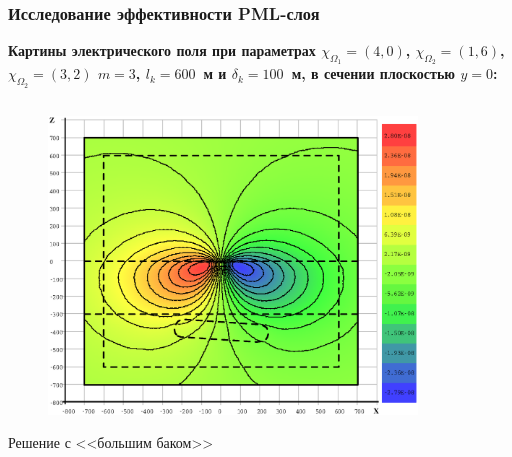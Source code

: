 \documentclass[aspectratio=43]{beamer}
\newcommand{\MakeTitle}[1]{\frametitle{\hspace{1.5em}\textbf{#1} \hfill \insertframenumber{} }}
\begin{document}
\begin{frame}
	\MakeTitle{Исследование эффективности PML-слоя}
	\textbf{Картины электрического поля при параметрах $\chi_{\Omega_1} = (4, 0)$, $\chi_{\Omega_2} = (1, 6)$, $\chi_{\Omega_2} = (3, 2)$ $m=3$, $l_k = 600$~м и $\delta_k = 100$~м, в сечении плоскостью $y=0$:}
	\begin{columns}[t,totalwidth=\linewidth]
		\hspace{-0.07\linewidth}
		\begin{column}{.5\linewidth}
			\vspace{-2.75em}
			\begin{figure}[H]
				\includegraphics[width=1.1\textwidth,height=1.1\textheight,keepaspectratio]{airloop_std_y=0_EyR.eps}
			\end{figure}
			\begin{center}
				\vspace{-1em}
				\tiny{Решение с <<большим баком>>}
			\end{center}
	\end{column}
		\begin{column}{.5\linewidth}
			\vspace{-2.75em}
			\begin{figure}[H]

\end{figure}
\end{column}
\end{columns}
\end{frame}
\end{document}
